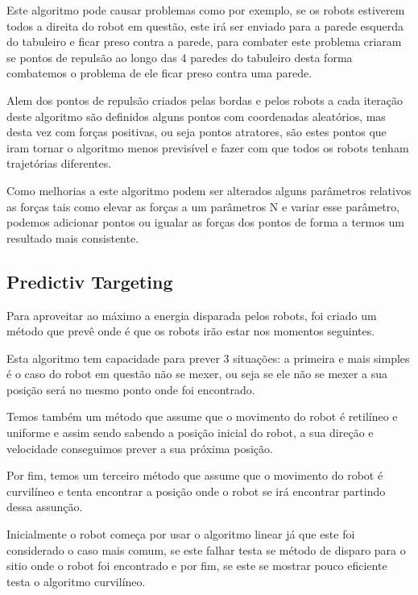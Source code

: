 Este algoritmo pode causar problemas como por exemplo, se os robots estiverem todos a direita do robot em questão, este irá ser enviado para a parede esquerda do tabuleiro e ficar preso contra a parede, para combater este problema criaram se pontos de repulsão ao longo das 4 paredes do tabuleiro desta forma combatemos o problema de ele ficar preso contra uma parede.

Alem dos pontos de repulsão criados pelas bordas e pelos robots a cada iteração deste algoritmo são definidos alguns pontos com coordenadas aleatórios, mas desta vez com forças positivas, ou seja pontos atratores, são estes pontos que iram tornar o algoritmo menos previsível e fazer com que todos os robots tenham trajetórias diferentes.

Como melhorias a este algoritmo podem ser alterados alguns parâmetros relativos as forças tais como elevar as forças a um parâmetros N e variar esse parâmetro, podemos adicionar pontos ou igualar as forças dos pontos de forma a termos um resultado mais consistente.

\subsection{Predictiv Targeting}

Para aproveitar ao máximo a energia disparada pelos robots, foi criado um método que prevê onde é que os robots irão estar nos momentos seguintes. 

Esta algoritmo tem capacidade para prever 3 situações: a primeira e mais simples é o caso do robot em questão não se mexer, ou seja se ele não se mexer a sua posição será no mesmo ponto onde foi encontrado.

Temos também um método que assume que o movimento do robot é retilíneo e uniforme e assim sendo sabendo a posição inicial do robot, a sua direção e velocidade conseguimos prever a sua próxima posição. 

Por fim, temos um terceiro método que assume que o movimento do robot é curvilíneo e tenta encontrar a posição onde o robot se irá encontrar partindo dessa assunção.

Inicialmente o robot começa por usar o algoritmo linear já que este foi considerado o caso mais comum, se este falhar testa se método de disparo para o sitio onde o robot foi encontrado e por fim, se este se mostrar pouco eficiente testa o algoritmo curvilíneo.